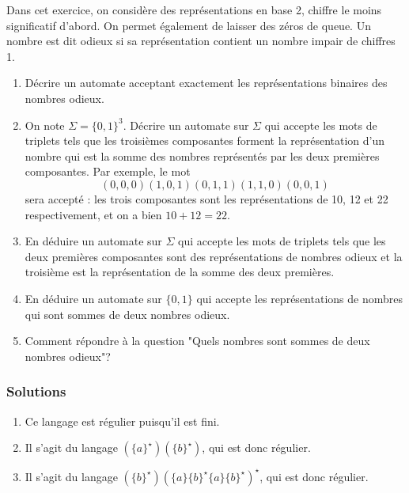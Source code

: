 \begin{exo}
Dans cet exercice, on considère des représentations en base 2, chiffre le moins significatif d'abord. On permet également de laisser des zéros de queue. Un nombre est dit odieux si sa représentation contient un nombre impair de chiffres 1.

\begin{enumerate}
\item Décrire un automate acceptant exactement les représentations binaires des nombres odieux.
\item On note $\Sigma=\{0,1\}^3$. Décrire un automate sur $\Sigma$ qui accepte les mots de triplets tels que les troisièmes composantes forment la représentation d'un nombre qui est la somme des nombres représentés par les deux premières composantes. Par exemple, le mot
\[(0,0,0)(1,0,1)(0,1,1)(1,1,0)(0,0,1)\]
sera accepté : les trois composantes sont les représentations de 10, 12 et 22 respectivement, et on a bien $10+12=22$.
\item En déduire un automate sur $\Sigma$ qui accepte les mots de triplets tels que les deux premières composantes sont des représentations de nombres odieux et la troisième est la représentation de la somme des deux premières.
\item En déduire un automate sur $\{0,1\}$ qui accepte les représentations de nombres qui sont sommes de deux nombres odieux.
\item Comment répondre à la question "Quels nombres sont sommes de deux nombres odieux"?
\end{enumerate}

\end{exo}

\subsubsection{Solutions}

\begin{sol}
\begin{enumerate}
\item Ce langage est régulier puisqu'il est fini.
\item Il s'agit du langage $(\{a\}^\star)(\{b\}^\star)$, qui est donc régulier.
\item Il s'agit du langage $(\{b\}^\star)(\{a\}\{b\}^\star\{a\}\{b\}^\star)^\star$, qui est donc régulier.
\end{enumerate}
\end{sol}

